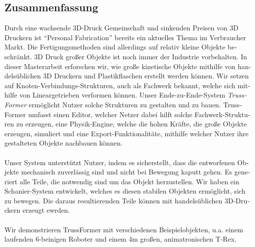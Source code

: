 \begin{otherlanguage}{ngerman}
\chapter*{Zusammenfassung}
Durch eine wachsende 3D-Druck Gemeinschaft und sinkenden Preisen von 3D Druckern ist ``Personal Fabrication'' bereits ein aktuelles Thema im Verbraucher Markt. Die Fertigungsmethoden sind allerdings auf relativ kleine Objekte beschränkt. 3D Druck großer Objekte ist noch immer der Industrie vorbehalten. In dieser Masterarbeit erforschen wir, wie große kinetische Objekte mithilfe von handelsüblichen 3D Druckern und Plastikflaschen erstellt werden können. Wir setzen auf Knoten-Verbindungs-Strukturen, auch als Fachwerk bekannt, welche sich mithilfe von Lineargetrieben verformen können. Unser Ende-zu-Ende-System \textit{TrussFormer} ermöglicht Nutzer solche Strukturen zu gestalten und zu bauen. TrussFormer umfasst einen Editor, welcher Netzer dabei hilft solche Fachwerk-Strukturen zu erzeugen, eine Physik-Engine, welche die hohen Kräfte, die große Objekte erzeugen, simuliert und eine Export-Funktionalitäte, mithilfe welcher Nutzer ihre gestalteten Objekte nachbauen können.\\
\\
Unser System unterstützt Nutzer, indem es sicherstellt, dass die entworfenen Objekte mechanisch zuverlässig sind und nicht bei Bewegung kaputt gehen. Es generiert alle Teile, die notwendig sind um das Objekt herzustellen. Wir haben ein Schanier-System entwickelt, welches es diesen stabilen Objekten ermöglicht, sich zu bewegen. Die daraus resultierenden Teile können mit handelsüblichen 3D-Druckern erzeugt ewrden.\\
\\
Wir demonstrieren TrussFormer mit verschiedenen Beispielobjekten, u.a. einem laufenden 6-beinigen Roboter und einem 4m großen, animatronischen T-Rex.
\end{otherlanguage}

\endgroup

\vfill
